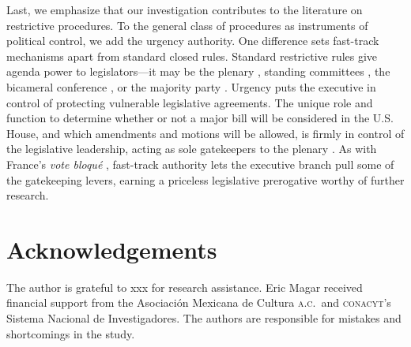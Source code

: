 \documentclass[letter,12pt]{article}
\begin{document}
Last, we emphasize that our investigation contributes to the literature on restrictive procedures. To the general class of procedures as instruments of political control, we add the urgency authority. One difference sets fast-track mechanisms apart from standard closed rules. Standard restrictive rules give agenda power to legislators---it may be the plenary \citep{mcnollgast.1987}, standing committees \citep{weingast.1992}, the bicameral conference \citep{shepsle.weingast.1987}, or the majority party \citep{cox.mccubbins.1997}. Urgency puts the executive in control of protecting vulnerable legislative agreements. The unique role and function to determine whether or not a major bill will be considered in the U.S. House, and which amendments and motions will be allowed, is firmly in control of the legislative leadership, acting as sole gatekeepers to the plenary \citep{cox.2006}. As with France's \emph{vote bloqu\'e} \citep{huber.1996b}, fast-track authority lets the executive branch pull some of the gatekeeping levers, earning a priceless legislative prerogative worthy of further research.

\section*{Acknowledgements}
The author is grateful to xxx for research assistance. Eric Magar received financial support from the Asociaci\'on Mexicana de Cultura \textsc{a.c.}\ and \textsc{conacyt}'s Sistema Nacional de Investigadores. The authors are responsible for mistakes and shortcomings in the study.

\listofendnotes








\end{document}
